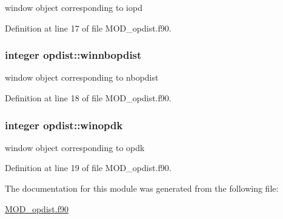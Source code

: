 window object corresponding to iopd 



Definition at line 17 of file M\-O\-D\-\_\-opdist.\-f90.

\hypertarget{classopdist_a2c4d310dd914a5297cc50389a69f869f}{
\subsubsection[{winnbopdist}]{\setlength{\rightskip}{0pt plus 5cm}integer opdist\-::winnbopdist}}\label{classopdist_a2c4d310dd914a5297cc50389a69f869f}


window object corresponding to nbopdist 



Definition at line 18 of file M\-O\-D\-\_\-opdist.\-f90.

\hypertarget{classopdist_a8aee101699cf64e1681ed6b24f75944b}{
\subsubsection[{winopdk}]{\setlength{\rightskip}{0pt plus 5cm}integer opdist\-::winopdk}}\label{classopdist_a8aee101699cf64e1681ed6b24f75944b}


window object corresponding to opdk 



Definition at line 19 of file M\-O\-D\-\_\-opdist.\-f90.



The documentation for this module was generated from the following file\-:\begin{DoxyCompactItemize}
\item 
\hyperlink{MOD__opdist_8f90}{M\-O\-D\-\_\-opdist.\-f90}\end{DoxyCompactItemize}
